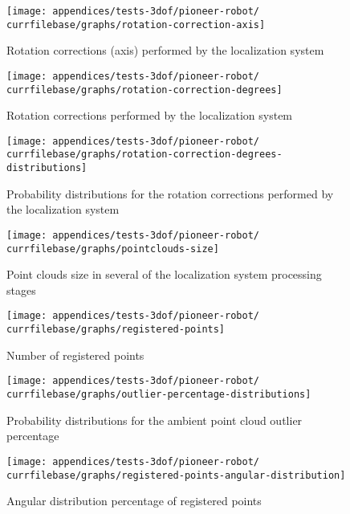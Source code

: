 \begin{figure}[H]
	\centering
	\texttt{[image: appendices/tests-3dof/pioneer-robot/\\currfilebase/graphs/rotation-correction-axis]}
	\caption{Rotation corrections (axis) performed by the localization system}
\end{figure}

\begin{figure}[H]
	\centering
	\texttt{[image: appendices/tests-3dof/pioneer-robot/\\currfilebase/graphs/rotation-correction-degrees]}
	\caption{Rotation corrections performed by the localization system}
\end{figure}

\begin{figure}[H]
	\centering
	\texttt{[image: appendices/tests-3dof/pioneer-robot/\\currfilebase/graphs/rotation-correction-degrees-distributions]}
	\caption{Probability distributions for the rotation corrections performed by the localization system}
\end{figure}


\begin{figure}[H]
	\centering
	\texttt{[image: appendices/tests-3dof/pioneer-robot/\\currfilebase/graphs/pointclouds-size]}
	\caption{Point clouds size in several of the localization system processing stages}
\end{figure}

\begin{figure}[H]
	\centering
	\texttt{[image: appendices/tests-3dof/pioneer-robot/\\currfilebase/graphs/registered-points]}
	\caption{Number of registered points}
\end{figure}

\begin{figure}[H]
	\centering
	\texttt{[image: appendices/tests-3dof/pioneer-robot/\\currfilebase/graphs/outlier-percentage-distributions]}
	\caption{Probability distributions for the ambient point cloud outlier percentage}
\end{figure}


\begin{figure}[H]
	\centering
	\texttt{[image: appendices/tests-3dof/pioneer-robot/\\currfilebase/graphs/registered-points-angular-distribution]}
	\caption{Angular distribution percentage of registered points}
\end{figure}

